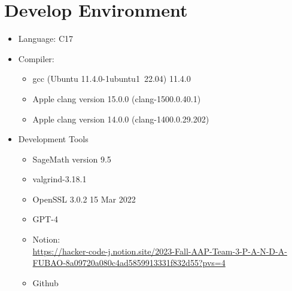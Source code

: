 \documentclass[12pt,a4paper]{article}
\begin{document}
	\newpage
	\section{Develop Environment}
	\begin{itemize}
		\item Language: C17
		\item Compiler: \begin{itemize}
			\item gcc (Ubuntu 11.4.0-1ubuntu1~22.04) 11.4.0
			\item Apple clang version 15.0.0 (clang-1500.0.40.1)
			\item Apple clang version 14.0.0 (clang-1400.0.29.202)
		\end{itemize}
		\item Development Tools
		\begin{itemize}
			\item SageMath version 9.5
			\item valgrind-3.18.1
			\item OpenSSL 3.0.2 15 Mar 2022
			\item GPT-4
			\item Notion:\\ \url{https://hacker-code-j.notion.site/2023-Fall-AAP-Team-3-P-A-N-D-A-FUBAO-8a09720a080c4ad5859913331f832d55?pvs=4}
			\item Github
		\end{itemize}
	\end{itemize}
	
	\newpage
\end{document}
